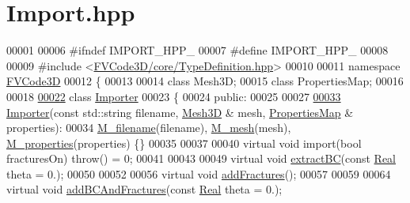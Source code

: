 \hypertarget{Import_8hpp_source}{}\section{Import.\+hpp}
\label{Import_8hpp_source}

\begin{DoxyCode}
00001 
00006 \textcolor{preprocessor}{#ifndef IMPORT\_HPP\_}
00007 \textcolor{preprocessor}{#define IMPORT\_HPP\_}
00008 
00009 \textcolor{preprocessor}{#include <\hyperlink{TypeDefinition_8hpp}{FVCode3D/core/TypeDefinition.hpp}>}
00010 
00011 \textcolor{keyword}{namespace }\hyperlink{namespaceFVCode3D}{FVCode3D}
00012 \{
00013 
00014 \textcolor{keyword}{class }Mesh3D;
00015 \textcolor{keyword}{class }PropertiesMap;
00016 
00018 
\hypertarget{Import_8hpp_source.tex_l00022}{}\hyperlink{classFVCode3D_1_1Importer}{00022} \textcolor{keyword}{class }\hyperlink{classFVCode3D_1_1Importer}{Importer}
00023 \{
00024 \textcolor{keyword}{public}:
00025 
00027 
\hypertarget{Import_8hpp_source.tex_l00033}{}\hyperlink{classFVCode3D_1_1Importer_a8d7a3f864c668155ffd4f29baafb6d05}{00033}     \hyperlink{classFVCode3D_1_1Importer_a8d7a3f864c668155ffd4f29baafb6d05}{Importer}(\textcolor{keyword}{const} std::string filename, \hyperlink{classFVCode3D_1_1Mesh3D}{Mesh3D} & mesh, 
      \hyperlink{classFVCode3D_1_1PropertiesMap}{PropertiesMap} & properties):
00034         \hyperlink{classFVCode3D_1_1Importer_a318e689fb93c5c906f85aa13685724d7}{M\_filename}(filename), \hyperlink{classFVCode3D_1_1Importer_a6f1542d6c6ac192e36c8eec7dc366653}{M\_mesh}(mesh), \hyperlink{classFVCode3D_1_1Importer_af678e18e971d5a132f5ba494981f6dae}{M\_properties}(properties) \{\}
00035 
00037 
00040     \textcolor{keyword}{virtual} \textcolor{keywordtype}{void} \textcolor{keyword}{import}(\textcolor{keywordtype}{bool} fracturesOn) \textcolor{keywordflow}{throw}() = 0;
00041 
00043 
00049     \textcolor{keyword}{virtual} \textcolor{keywordtype}{void} \hyperlink{classFVCode3D_1_1Importer_a1cba26ff3b2c475a51866361883c59fc}{extractBC}(\textcolor{keyword}{const} \hyperlink{namespaceFVCode3D_a40c1f5588a248569d80aa5f867080e83}{Real} theta = 0.);
00050 
00052 
00056     \textcolor{keyword}{virtual} \textcolor{keywordtype}{void} \hyperlink{classFVCode3D_1_1Importer_ac3c29fd7bbccef4ae39ce8d0b63b789f}{addFractures}();
00057 
00059 
00064     \textcolor{keyword}{virtual} \textcolor{keywordtype}{void} \hyperlink{classFVCode3D_1_1Importer_ac21d82671c21b2e4069511ef0585d7f6}{addBCAndFractures}(\textcolor{keyword}{const} \hyperlink{namespaceFVCode3D_a40c1f5588a248569d80aa5f867080e83}{Real} theta = 0.);

\end{DoxyCode}
